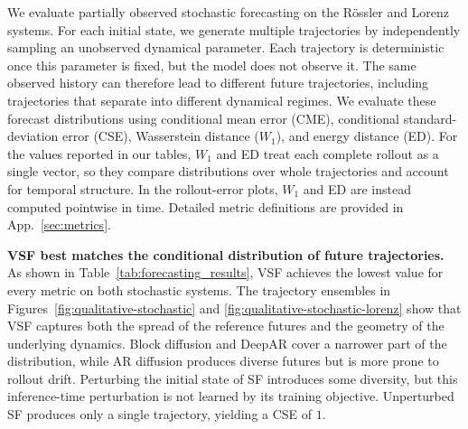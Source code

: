%

We evaluate partially observed stochastic forecasting on the R\"ossler and
Lorenz systems. For each initial state, we generate multiple trajectories by
independently sampling an unobserved dynamical parameter. Each trajectory is
deterministic once this parameter is fixed, but the model does not observe it.
The same observed history can therefore lead to different future trajectories,
including trajectories that separate into different dynamical regimes.
%
We evaluate these forecast distributions using conditional mean error (CME),
conditional standard-deviation error (CSE), Wasserstein distance ($W_1$), and
energy distance (ED). For the values reported in our tables, $W_1$ and ED treat
each complete rollout as a single vector, so they compare distributions over
whole trajectories and account for temporal structure. In the rollout-error
plots, $W_1$ and ED are instead computed pointwise in time. Detailed metric
definitions are provided in App.~\ref{sec:metrics}.


\textbf{VSF best matches the conditional distribution of future trajectories.}
As shown in Table~\ref{tab:forecasting_results}, VSF achieves the lowest value
for every metric on both stochastic systems. The trajectory ensembles in
Figures~\ref{fig:qualitative-stochastic} and
\ref{fig:qualitative-stochastic-lorenz} show that VSF captures both the spread
of the reference futures and the geometry of the underlying dynamics. Block
diffusion and DeepAR cover a narrower part of the distribution, while AR
diffusion produces diverse futures but is more prone to rollout drift.
Perturbing the initial state of SF introduces some diversity, but this
inference-time perturbation is not learned by its training objective.
Unperturbed SF produces only a single trajectory, yielding a CSE of $1$.



